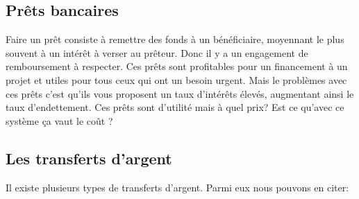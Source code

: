 \documentclass[12pt]{report}
\begin{document}
    \subsection{Prêts bancaires}
    
\hspace{1cm} Faire un prêt consiste à remettre des fonds à un bénéficiaire, moyennant le plus souvent à un intérêt à verser au prêteur. Donc il y a un engagement de remboursement à respecter. Ces prêts sont profitables pour un financement à un projet et utiles pour tous ceux qui ont un besoin urgent. Mais le problèmes avec ces prêts c'est qu'ils vous proposent un taux d'intérêts élevés, augmentant ainsi le taux d'endettement. Ces prêts sont d'utilité mais à quel prix? Est ce qu'avec ce système ça vaut le coût ?


    \subsection{Les transferts d'argent}
    
Il existe plusieurs types de transferts  d'argent. Parmi eux nous pouvons en citer: 
\end{document}
